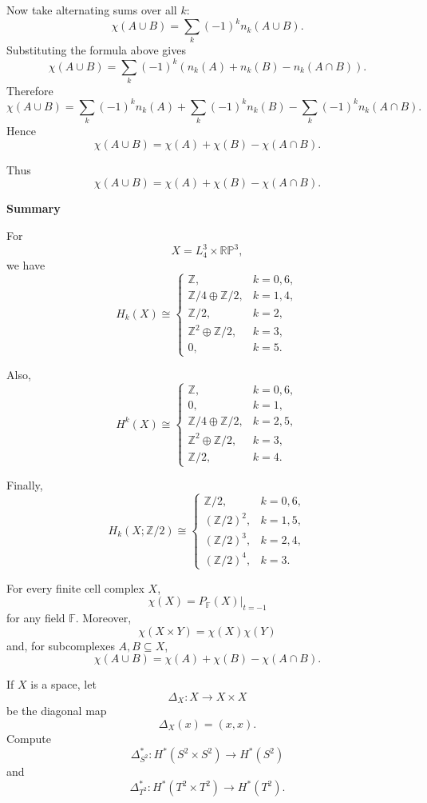 \begin{solution}
Now take alternating sums over all \(k\):
\[
\chi(A\cup B)
=
\sum_k (-1)^k n_k(A\cup B).
\]
Substituting the formula above gives
\[
\chi(A\cup B)
=
\sum_k (-1)^k
\left(
n_k(A)+n_k(B)-n_k(A\cap B)
\right).
\]
Therefore
\[
\chi(A\cup B)
=
\sum_k (-1)^k n_k(A)
+
\sum_k (-1)^k n_k(B)
-
\sum_k (-1)^k n_k(A\cap B).
\]
Hence
\[
\chi(A\cup B)
=
\chi(A)+\chi(B)-\chi(A\cap B).
\]

Thus
\[
\boxed{
	\chi(A\cup B)=\chi(A)+\chi(B)-\chi(A\cap B).}
\]


\medskip
\noindent\textbf{Summary}\par
\smallskip


For
\[
X=L_4^3\times \mathbb{RP}^3,
\]
we have
\[
\boxed{
	H_k(X)\cong
	\begin{cases}
		\mathbb Z, & k=0,6,\\[1mm]
		\mathbb Z/4\oplus \mathbb Z/2, & k=1,4,\\[1mm]
		\mathbb Z/2, & k=2,\\[1mm]
		\mathbb Z^2\oplus \mathbb Z/2, & k=3,\\[1mm]
		0, & k=5.
\end{cases}}
\]

Also,
\[
\boxed{
	H^k(X)\cong
	\begin{cases}
		\mathbb Z, & k=0,6,\\[1mm]
		0, & k=1,\\[1mm]
		\mathbb Z/4\oplus \mathbb Z/2, & k=2,5,\\[1mm]
		\mathbb Z^2\oplus \mathbb Z/2, & k=3,\\[1mm]
		\mathbb Z/2, & k=4.
\end{cases}}
\]

Finally,
\[
\boxed{
	H_k(X;\mathbb Z/2)\cong
	\begin{cases}
		\mathbb Z/2, & k=0,6,\\[1mm]
		(\mathbb Z/2)^2, & k=1,5,\\[1mm]
		(\mathbb Z/2)^3, & k=2,4,\\[1mm]
		(\mathbb Z/2)^4, & k=3.
\end{cases}}
\]

For every finite cell complex \(X\),
\[
\boxed{
	\chi(X)=P_{\mathbb F}(X)\big|_{t=-1}}
\]
for any field \(\mathbb F\). Moreover,
\[
\boxed{
	\chi(X\times Y)=\chi(X)\chi(Y)}
\]
and, for subcomplexes \(A,B\subseteq X\),
\[
\boxed{
	\chi(A\cup B)=\chi(A)+\chi(B)-\chi(A\cap B).}
\]
\end{solution}

\begin{problem}
If \(X\) is a space, let
\[
\Delta_X:X\to X\times X
\]
be the diagonal map
\[
\Delta_X(x)=(x,x).
\]
Compute
\[
\Delta_{S^2}^*:H^*(S^2\times S^2)\to H^*(S^2)
\]
and
\[
\Delta_{T^2}^*:H^*(T^2\times T^2)\to H^*(T^2).
\]
\end{problem}

